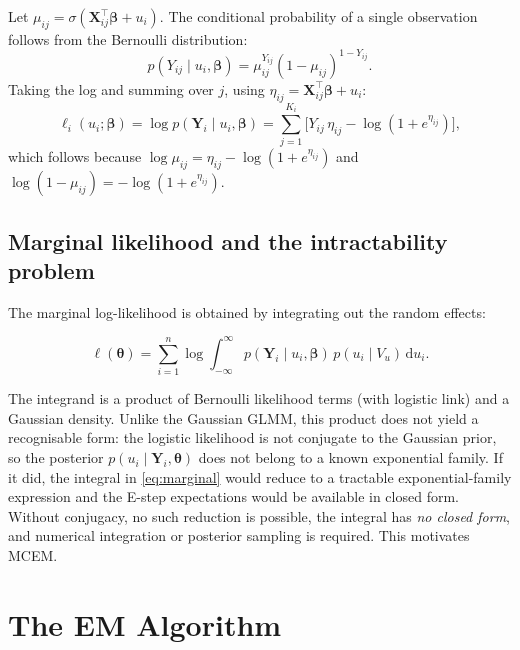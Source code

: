 \documentclass[11pt,a4paper]{article}
\theoremstyle{definition}
\theoremstyle{remark}
\newcommand{\sig}{\sigma}           %
\newcommand{\bY}{\mathbf{Y}}
\newcommand{\bX}{\mathbf{X}}
\newcommand{\bbeta}{\boldsymbol{\beta}}
\newcommand{\btheta}{\boldsymbol{\theta}}
\newcommand{\given}{\mid}
\begin{document}
Let $\mu_{ij} = \sig(\bX_{ij}^\top\bbeta + u_i)$.
The conditional probability of a single observation follows from the Bernoulli
distribution:
\begin{equation}
  p(Y_{ij} \given u_i, \bbeta) = \mu_{ij}^{Y_{ij}}(1-\mu_{ij})^{1-Y_{ij}}.
  \label{eq:bernoulli}
\end{equation}
Taking the log and summing over $j$, using $\eta_{ij} = \bX_{ij}^\top\bbeta + u_i$:
\begin{equation}
  \ell_i(u_i; \bbeta) = \log p(\bY_i \given u_i, \bbeta)
    = \sum_{j=1}^{K_i} \bigl[
        Y_{ij}\,\eta_{ij} - \log(1 + e^{\eta_{ij}})
      \bigr],
  \label{eq:cond-loglik}
\end{equation}
which follows because $\log\mu_{ij} = \eta_{ij} - \log(1+e^{\eta_{ij}})$ and
$\log(1-\mu_{ij}) = -\log(1+e^{\eta_{ij}})$.

\subsection{Marginal likelihood and the intractability problem}

The marginal log-likelihood is obtained by integrating out the random effects:

\begin{equation}
  \ell(\btheta) = \sum_{i=1}^n \log \int_{-\infty}^{\infty}
    p(\bY_i \given u_i, \bbeta)\, p(u_i \given V_u)\, \mathrm{d}u_i.
  \label{eq:marginal}
\end{equation}

The integrand is a product of Bernoulli likelihood terms (with logistic link)
and a Gaussian density.  Unlike the Gaussian GLMM, this product does not yield
a recognisable form: the logistic likelihood is not conjugate to the Gaussian
prior, so the posterior $p(u_i \given \bY_i, \btheta)$ does not belong to a
known exponential family.  If it did, the integral in \eqref{eq:marginal}
would reduce to a tractable exponential-family expression and the E-step
expectations would be available in closed form.  Without conjugacy, no such
reduction is possible, the integral has \emph{no closed form}, and numerical
integration or posterior sampling is required.  This motivates MCEM.

\section{The EM Algorithm}
\end{document}
